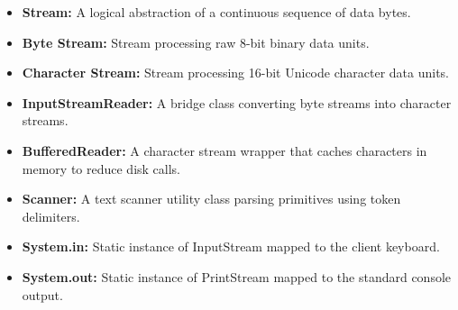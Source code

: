 \documentclass[12pt,a4paper]{article}
\begin{document}
\begin{tcolorbox}[defbox, title={\textbf{One-Line Definitions}}]
\begin{itemize}[leftmargin=*, itemsep=2pt]
  \item \textbf{Stream:} A logical abstraction of a continuous sequence of data bytes.
  \item \textbf{Byte Stream:} Stream processing raw 8-bit binary data units.
  \item \textbf{Character Stream:} Stream processing 16-bit Unicode character data units.
  \item \textbf{InputStreamReader:} A bridge class converting byte streams into character streams.
  \item \textbf{BufferedReader:} A character stream wrapper that caches characters in memory to reduce disk calls.
  \item \textbf{Scanner:} A text scanner utility class parsing primitives using token delimiters.
  \item \textbf{System.in:} Static instance of InputStream mapped to the client keyboard.
  \item \textbf{System.out:} Static instance of PrintStream mapped to the standard console output.
\end{itemize}
\end{tcolorbox}
\end{document}
